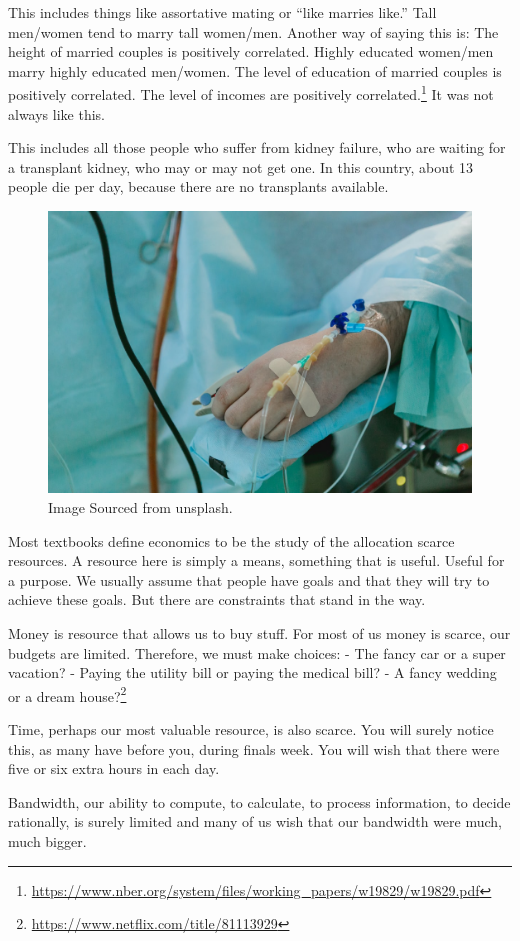 \documentclass[
]{book}
\begin{document}
This includes things like assortative mating or ``like marries like.'' Tall men/women tend to marry tall women/men. Another way of saying this is: The height of married couples is positively correlated. Highly educated women/men marry highly educated men/women. The level of education of married couples is positively correlated. The level of incomes are positively correlated.\footnote{\url{https://www.nber.org/system/files/working_papers/w19829/w19829.pdf}} It was not always like this.

This includes all those people who suffer from kidney failure, who are waiting for a transplant kidney, who may or may not get one. In this country, about 13 people die per day, because there are no transplants available.

\begin{figure}

{\centering \includegraphics[width=0.5\linewidth]{img/ch0/fig6} 

}

\caption{Image Sourced from unsplash.}\label{fig:fig006}
\end{figure}

Most textbooks define economics to be the study of the allocation scarce resources. A resource here is simply a means, something that is useful. Useful for a purpose. We usually assume that people have goals and that they will try to achieve these goals. But there are constraints that stand in the way.

Money is resource that allows us to buy stuff. For most of us money is scarce, our budgets are limited. Therefore, we must make choices:
- The fancy car or a super vacation?
- Paying the utility bill or paying the medical bill?
- A fancy wedding or a dream house?\footnote{\url{https://www.netflix.com/title/81113929}}

Time, perhaps our most valuable resource, is also scarce. You will surely notice this, as many have before you, during finals week. You will wish that there were five or six extra hours in each day.

Bandwidth, our ability to compute, to calculate, to process information, to decide rationally, is surely limited and many of us wish that our bandwidth were much, much bigger.
\end{document}

